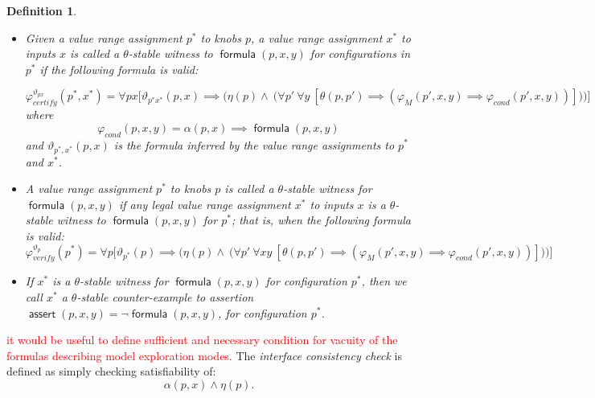 \documentclass[a4paper,parskip=half]{article} %
\newcommand*\eqdef=
\newcommand*\assert{\operatorname{\mathsf{assert}}}
\newcommand*\formula{\operatorname{\mathsf{formula}}}
\newcommand\todozk[1]{\textcolor{red}{#1}}
\newtheorem{defn}[thm]{Definition}
\newcommand*\ZK{\todozk}
\begin{document}
\begin{defn}\label{def:stable:witness:validity:ranges}
\begin{itemize}
\item
Given a value range assignment $p^*$ to knobs $p$, a value range assignment $x^*$ to inputs $x$ is called a \emph{$\theta$-stable witness}
to $\formula(p,x,y)$ for configurations in $p^*$ if the following formula is valid:

\begin{equation}\label{form:gear:certify:knobs:inputs:ranges}
\varphi_{\mathit{certify}}^{\vartheta_{px}}(p^*, x^*) \eqdef  
    \forall px \big[ \vartheta_{p^*x^*}(p,x) \implies \big(
     \eta(p) \wedge ~\big(
    \forall p'~
    \forall y~[ \theta(p, p') \implies (\varphi_M(p',x,y)  \implies  \varphi_{\mathit{cond}}(p',x,y)) ]
   \big) \big) \big]
\end{equation}
where \[\varphi_{\mathit{cond}}(p,x,y) \eqdef \alpha(p,x) \implies \formula(p,x,y)\]
\noindent and $\vartheta_{p^*,x^*}(p,x)$ is the formula inferred by the value range assignments 
to $p^*$ and $x^*$. 

\item
A value range assignment $p^*$ to knobs $p$ is called a  \emph{$\theta$-stable witness for $\formula(p,x,y)$} if any legal value range assignment 
$x^*$ to inputs $x$ is a $\theta$-stable witness to $\formula(p,x,y)$ for $p^*$; that is, when the following formula is valid:
\begin{equation}\label{form:gear:certify:knobs:ranges}
\varphi_{\mathit{verify}}^{\vartheta_p}(p^*) \eqdef
  \forall p \big[ \vartheta_{p^*}(p) \implies \big(
     \eta(p) \wedge ~\big(
    \forall p'~
    \forall xy~[
   \theta(p, p') \implies (\varphi_M(p',x,y)  \implies  \varphi_{\mathit{cond}}(p',x,y))
    ]\big) \big) \big]
\end{equation}
\item 
If $x^*$ is a  $\theta$-stable witness for $\formula(p, x,y)$ for configuration $p^*$, then we call $x^*$  a \emph{$\theta$-stable
counter-example to  assertion $\assert(p, x,y)  \eqdef \neg \formula(p, x,y)$, for configuration $p^*$}.
\end{itemize}
\end{defn}


\ZK{it would be useful to define sufficient and necessary condition for vacuity of the formulas describing model exploration modes.}
The \emph{interface consistency check} is defined as simply checking satisfiability  of: 
\begin{equation}\label{form:interface:consistency}
\alpha(p, x) \wedge \eta(p). 
\end{equation}
\end{document}
